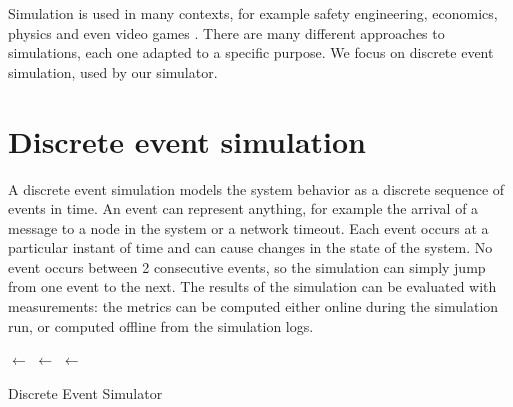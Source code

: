 \medskip
Simulation is used in many contexts, for example safety engineering, economics, physics and even video games \cite{wikipedia_simulation}.
There are many different approaches to simulations, each one adapted to a specific purpose.
We focus on discrete event simulation, used by our simulator.


\section{Discrete event simulation}
A discrete event simulation models the system behavior as a discrete sequence of events in time.
An event can represent anything, for example the arrival of a message to a node in the system or a network timeout.
Each event occurs at a particular instant of time and can cause changes in the state of the system.
No event occurs between \num{2} consecutive events, so the simulation can simply jump from one event to the next.
The results of the simulation can be evaluated with measurements:
the metrics can be computed either online during the simulation run, or computed offline from the simulation logs.

\medskip
\begin{algorithm}[h]
	\DontPrintSemicolon


	\BlankLine
	 \;
	\State $\leftarrow$ \InitializeState{} \;
	\Events $\leftarrow$ \InitializeEvents{} \;
	\Queue $\leftarrow$ \New \PriorityQueue{\Events} \;

	\BlankLine
	\BlankLine
	 \;
	\BlankLine

	\caption{Discrete Event Simulator}
	\label{alg:des}
\end{algorithm}
\smallskip

